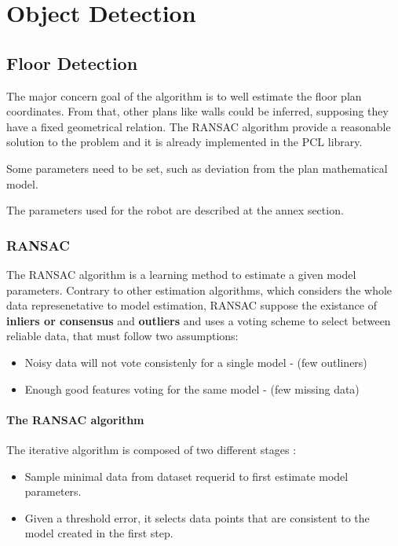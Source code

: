 \chapter { Object Detection }


\section { Floor Detection } 

The major concern goal of the algorithm is to well estimate the floor plan coordinates. From that, other plans like walls could be inferred, supposing they have a fixed geometrical relation. The RANSAC algorithm provide a reasonable solution to the problem and it is already implemented in the PCL library.

Some parameters need to be set, such as deviation from the plan mathematical model.

The parameters used for the robot are described at the annex section.

\subsection { RANSAC } 

The RANSAC algorithm is a learning method to estimate a given model parameters. Contrary to other estimation algorithms, which considers the whole data represenetative to model estimation, RANSAC suppose the existance of \textbf{inliers or consensus} and \textbf{outliers}  and uses a voting scheme to select between reliable data, that must follow two assumptions: 

\begin{itemize}
  \item Noisy data will not vote consistenly for a single model - (few outliners) 
  \item Enough good features voting for the same model - (few missing data)
\end{itemize}

\subsubsection{The RANSAC algorithm}

The iterative algorithm is composed of two different stages : 
\begin {itemize}
  \item Sample minimal data from dataset requerid to first estimate model parameters.
  \item Given a threshold error, it selects data points that are consistent to the model created in the first step.
\end {itemize}

